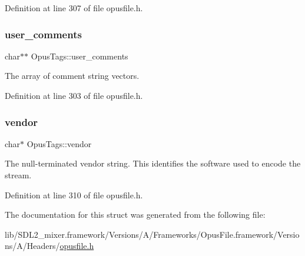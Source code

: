 Definition at line 307 of file opusfile.\+h.

\mbox{\label{struct_opus_tags_ad53d571bd8b23691089242e4e161358a}} 
\subsubsection{\texorpdfstring{user\_comments}{user\_comments}}
{\footnotesize\ttfamily char$\ast$$\ast$ Opus\+Tags\+::user\+\_\+comments}

The array of comment string vectors. 

Definition at line 303 of file opusfile.\+h.

\mbox{\label{struct_opus_tags_af6ff133dfd801934d981bc5905dae0bd}} 
\subsubsection{\texorpdfstring{vendor}{vendor}}
{\footnotesize\ttfamily char$\ast$ Opus\+Tags\+::vendor}

The null-\/terminated vendor string. This identifies the software used to encode the stream. 

Definition at line 310 of file opusfile.\+h.



The documentation for this struct was generated from the following file\+:\begin{DoxyCompactItemize}
\item 
lib/\+S\+D\+L2\+\_\+mixer.\+framework/\+Versions/\+A/\+Frameworks/\+Opus\+File.\+framework/\+Versions/\+A/\+Headers/\mbox{\hyperlink{opusfile_8h}{opusfile.\+h}}\end{DoxyCompactItemize}
